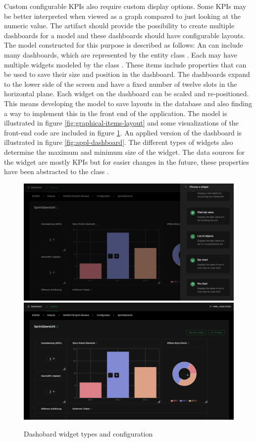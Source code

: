 Custom configurable KPIs also require custom display options. Some KPIs may be better interpreted when viewed as a graph compared to just looking at the numeric value. The artifact should provide the possibility to create multiple dashboards for a model and these dashboards should have configurable layouts. The model constructed for this purpose is described as follows: An  can include many dashboards, which are represented by the entity class . Each  may have multiple widgets modeled by the class . These items include properties that can be used to save their size and position in the dashboard. The dashboards expand to the lower side of the screen and have a fixed number of twelve slots in the horizontal plane. Each widget on the dashboard can be scaled and re-positioned. This means developing the model to save layouts in the database and also finding a way to implement this in the front end of the application.
The model is illustrated in figure \ref{fig:graphical-items-layout} and some visualizations of the front-end code are included in figure \ref{fig:dashboards-config}. An applied version of the dashboard is illustrated in figure \ref{fig:appl-dashboard}. The different types of widgets also determine the maximum and minimum size of the widget. The data sources for the widget are mostly KPIs but for easier changes in the future, these properties have been abstracted to the class .

\begin{figure}
    \centering
    \includegraphics[width=0.6\linewidth]{Figures/DashboardsConfig.png}
    \includegraphics[width=0.6\linewidth]{Figures/DashboardConfigWidgets.png}
    \caption{Dashobard widget types and configuration}
    \label{fig:dashboards-config}
\end{figure}

